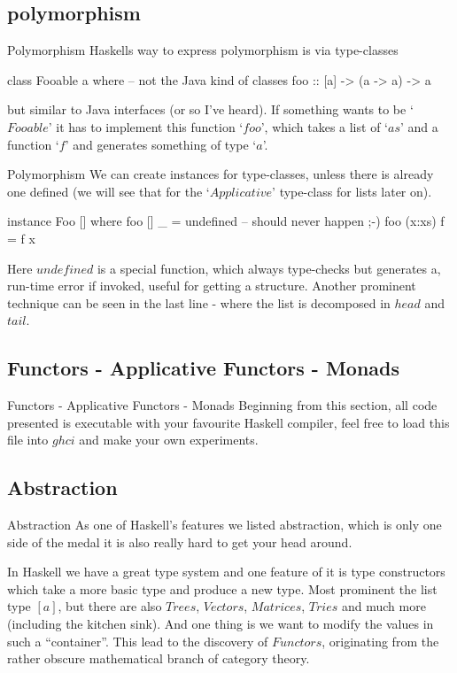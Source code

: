 \documentclass{beamer}
\begin{document}
\subsection{polymorphism} %
\begin{frame}[fragile]{Polymorphism}
Haskells way to express polymorphism is via type-classes
\begin{code}%
    class Fooable a where -- not the Java kind of classes
        foo :: [a] -> (a -> a) -> a
\end{code}
but similar to Java interfaces (or so I've heard).
If something wants to be ‘$Fooable$’ it has to implement this function ‘$foo$’,
which takes a list of ‘$as$’ and a function ‘$f$’ and generates something of
type ‘$a$’.
\end{frame}

\begin{frame}[fragile]{Polymorphism}
We can create instances for type-classes, unless there is already one defined (we
will see that for the ‘$Applicative$’ type-class for lists later on).
\begin{code}%
    instance Foo [] where
        foo [] _ = undefined -- should never happen ;-)
        foo (x:xs) f = f x
\end{code}
Here $undefined$ is a special function, which always type-checks but generates a,
run-time error if invoked, useful for getting a structure.
Another prominent technique can be seen in the last line - where the list is
decomposed in $head$ and $tail$.
\end{frame}

\subsection{Functors - Applicative Functors - Monads}
\begin{frame}[fragile]{Functors - Applicative Functors - Monads}
Beginning from this section, all code presented is executable with your
favourite Haskell compiler, feel free to load this file into $ghci$ and make your
own experiments.
\end{frame}

\subsection{Abstraction}
\begin{frame}[fragile]{Abstraction}
As one of Haskell's features we listed abstraction, which is only one side of
the medal it is also really hard to get your head around.

In Haskell we have a great type system and one feature of it is type
constructors which take a more basic type and produce a new type. Most prominent
the list type $[a]$, but there are also $Trees$, $Vectors$, $Matrices$, $Tries$ and much
more (including the kitchen sink). And one thing is we want to modify the values
in such a “container”. This lead to the discovery of $Functors$, originating from
the rather obscure mathematical branch of category theory.
\end{frame}
\end{document}

